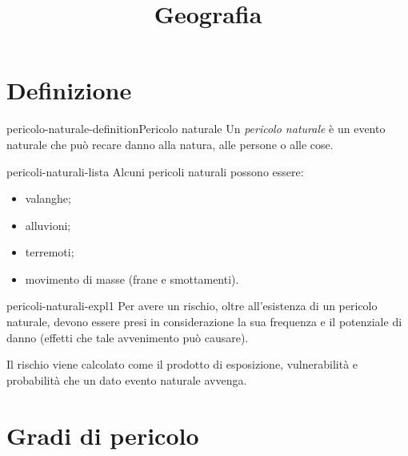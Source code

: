\documentclass[preview]{standalone}
\begin{document}
\title{Geografia}
\genpage

\section{Definizione}

\begin{snippetdefinition}{pericolo-naturale-definition}{Pericolo naturale}
    Un \textit{pericolo naturale} è un evento naturale che può recare danno alla
    natura, alle persone o alle cose.
\end{snippetdefinition}

\begin{snippet}{pericoli-naturali-lista}
    Alcuni pericoli naturali possono essere:
    \begin{itemize}
        \item valanghe;
        \item alluvioni;
        \item terremoti;
        \item movimento di masse (frane e smottamenti).
    \end{itemize}
\end{snippet}

\begin{snippet}{pericoli-naturali-expl1}
    Per avere un rischio, oltre all'esistenza di un pericolo naturale, devono essere presi
    in considerazione la sua frequenza e il potenziale di danno (effetti che tale
    avvenimento può causare).

    Il rischio viene calcolato come il prodotto di
    esposizione, vulnerabilità e probabilità che un dato evento naturale avvenga.
\end{snippet}

\section{Gradi di pericolo}

\end{document}
